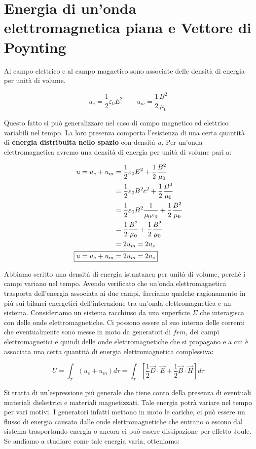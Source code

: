 \section{Energia di un'onda elettromagnetica piana e Vettore di Poynting}

Al campo elettrico e al campo magnetico sono associate delle densità di energia per unità di volume.

\[
	u_e = \frac{1}{2} \varepsilon_0 E^2 \qquad u_m=\frac{1}{2} \frac{B^2}{\mu_0}
\]

Questo fatto si può generalizzare nel caso di campo magnetico ed elettrico variabili nel tempo. La loro presenza comporta l'esistenza di una certa quantità di \textbf{energia distribuita nello spazio} con densità $u$. Per un'onda elettromagnetica avremo una densità di energia per unità di volume pari a:

\begin{align*}
	u = u_e + u_m &= \frac{1}{2} \varepsilon_0 E^2 + \frac{1}{2} \frac{B^2}{\mu_0} \\
	&= \frac{1}{2} \varepsilon_0 B^2 c^2 + \frac{1}{2} \frac{B^2}{\mu_0} \\
	&= \frac{1}{2} \varepsilon_0 B^2 \frac{1}{\mu_0 \varepsilon_0} + \frac{1}{2} \frac{B^2}{\mu_0} \\
	&= \frac{1}{2} \frac{B^2}{\mu_0} + \frac{1}{2} \frac{B^2}{\mu_0} \\
	&= 2u_m = 2u_e \\
	\Aboxed{u = u_e + u_m &= 2u_m = 2u_e}
\end{align*}

Abbiamo scritto una densità di energia istantanea per unità di volume, perché i campi variano nel tempo.
Avendo verificato che un'onda elettromagnetica trasporta dell'energia associata ai due campi, facciamo qualche ragionamento in più sui bilanci energetici dell'interazione tra un'onda elettromagnetica e un sistema. Consideriamo un sistema racchiuso da una superficie $\Sigma$ che interagisca con delle onde elettromagnetiche. Ci possono essere al suo interno delle correnti che eventualmente sono messe in moto da generatori di $fem$, dei campi elettromagnetici e quindi delle onde elettromagnetiche che si propagano e a cui è associata una certa quantità di energia elettromagnetica complessiva:

\[
	\boxed{U = \int_{\tau}(u_e+u_m)d\tau = \int_{\tau}\left[ \frac{1}{2} \vec{D} \cdot \vec{E} + \frac{1}{2} \vec{B} \cdot \vec{H} \right] d\tau}
\]

Si tratta di un'espressione più generale che tiene conto della presenza di eventuali materiali dielettrici e materiali magnetizzati. Tale energia potrà variare nel tempo per vari motivi. I generatori infatti mettono in moto le cariche, ci può essere un flusso di energia causato dalle onde elettromagnetiche che entrano o escono dal sistema trasportando energia o ancora ci può essere dissipazione per effetto Joule. Se andiamo a studiare come tale energia varia, otteniamo:

